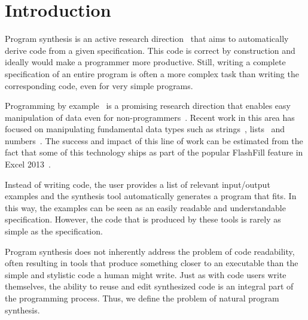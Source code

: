 \section{Introduction}
\label{intro}

Program synthesis is an active research direction~\cite{DBLP:journals/toplas/MannaW80, DBLP:journals/cacm/GulwaniHS12,DBLP:conf/icfp/Bodik15, DBLP:conf/pldi/KuncakMPS10, DBLP:conf/aplas/Solar-Lezama09, DBLP:conf/pldi/SrivastavaGCF11} that aims to automatically derive code from a given specification.
This code is correct by construction and ideally would make a programmer more productive.
Still, writing a complete specification of an entire program is often a more complex task than writing the corresponding code, even for very simple programs.

Programming by example~\cite{cypher93,lieberman01,synasc12} is a promising research direction that enables easy manipulation of data even for non-programmers~\cite{GulwaniHS12}.
Recent work in this area has focused on manipulating fundamental data types such as strings~\cite{flashFillPOPL,vldb12,icml13}, lists~\cite{FeserCD15,Osera:2015} and numbers~\cite{cav12}.
The success and impact of this line of work can be estimated from the fact that some of this technology ships as part of the popular FlashFill feature in Excel 2013~\cite{flashFillPOPL}.

Instead of writing code, the user provides a list of relevant input/output examples and the synthesis tool automatically generates a program that fits.
In this way, the examples can be seen as an easily readable and understandable specification.
However, the code that is produced by these tools is rarely as simple as the specification.

Program synthesis does not inherently address the problem of code readability, often resulting in tools that produce something closer to an executable than the simple and stylistic code a human might write.
Just as with code users write themselves, the ability to reuse and edit synthesized code is an integral part of the programming process.
Thus, we define the problem of natural program synthesis.

